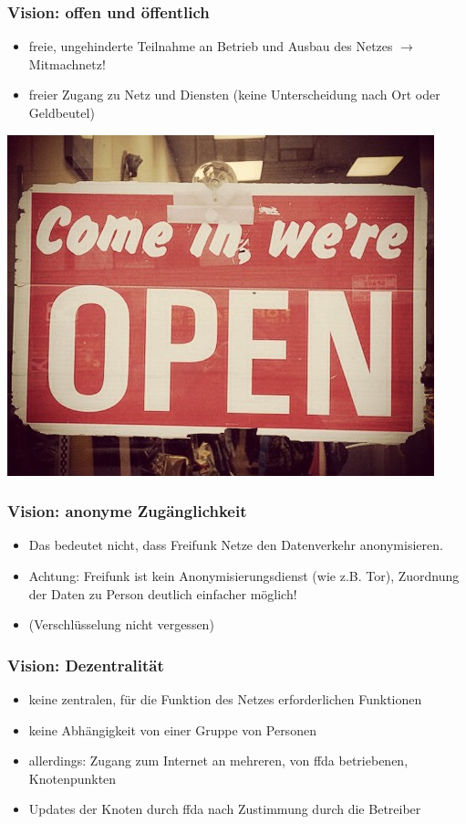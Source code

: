 \documentclass[handout, 10pt]{beamer}
\begin{document}
\begin{frame}
	\frametitle{Vision: offen und öffentlich}
	
	\begin{itemize}[<+->]
		\item freie, ungehinderte Teilnahme an Betrieb und Ausbau des Netzes $\rightarrow$ Mitmachnetz!
		\item freier Zugang zu Netz und Diensten (keine Unterscheidung nach Ort oder Geldbeutel)
	\end{itemize}
	\includegraphics[scale=0.3]{images/open}
\end{frame}

\begin{frame}
	\frametitle{Vision: anonyme Zugänglichkeit}
	
	\begin{itemize}[<+->]
		\item Das bedeutet nicht, dass Freifunk Netze den Datenverkehr anonymisieren.
		\item Achtung: Freifunk ist kein Anonymisierungsdienst (wie z.B. Tor), Zuordnung der Daten zu Person deutlich einfacher möglich!
		\item (Verschlüsselung nicht vergessen)
	\end{itemize}
\end{frame}

\begin{frame}
	\frametitle{Vision: Dezentralität}
	
	\begin{itemize}[<+->]
		\item keine zentralen, für die Funktion des Netzes erforderlichen Funktionen
		\item keine Abhängigkeit von einer Gruppe von Personen
		\item allerdings: Zugang zum Internet an mehreren, von ffda betriebenen, Knotenpunkten
		\item Updates der Knoten durch ffda nach Zustimmung durch die Betreiber
	\end{itemize}
\end{frame}
\end{document}
